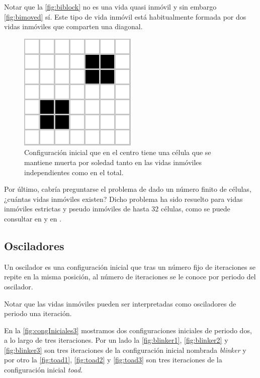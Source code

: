 \documentclass[../proyecto.tex]{memoir}
\begin{document}
Notar que la \autoref{fig:biblock} no es una vida quasi inmóvil y sin embargo \autoref{fig:bimoved} sí. Este tipo de vida inmóvil está habitualmente formada por dos vidas inmóviles que comparten una diagonal.

\begin{figure}[H]
	\centering
	\includegraphics[height=.2\linewidth]{./images/bimoved.png}
	\caption{Configuración inicial que en el centro tiene una célula que se mantiene muerta por soledad tanto en las vidas inmóviles independientes como en el total.}
	\label{fig:bimoved}
\end{figure} 

Por último, cabría preguntarse el problema de dado un número finito de células, ¿cuántas vidas inmóviles existen? Dicho problema ha sido resuelto para vidas inmóviles estrictas y pseudo inmóviles de hasta 32 células, como se puede consultar en \cite{countStillLifes} y en \cite{countPseudoStillLifes}.

\subsection{Osciladores}


\begin{defi}
Un oscilador es una configuración inicial que tras un número fijo de iteraciones se repite en la misma posición, al número de iteraciones se le conoce por periodo del oscilador.
\end{defi}

Notar que las vidas inmóviles pueden ser interpretadas como osciladores de periodo una iteración.

En la \autoref{fig:congIniciales3} mostramos dos configuraciones iniciales de periodo dos, a lo largo de tres iteraciones. Por un lado la \autoref{fig:blinker1}, \autoref{fig:blinker2} y \autoref{fig:blinker3} son tres iteraciones de la configuración inicial nombrada \textit{blinker} y por otro la \autoref{fig:toad1}, \autoref{fig:toad2} y \autoref{fig:toad3} son tres iteraciones de la configuración inicial \textit{toad}.
\end{document}
